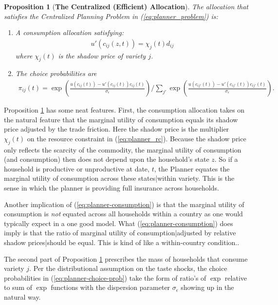 \documentclass[12pt,pdftex]{article}
\newtheorem{prp}{Proposition}
\begin{document}
\begin{onehalfspacing}
\begin{prp}[\textbf{The Centralized (Efficient) Allocation}]\label{prp:efficient-allocation} The allocation that satisfies the Centralized Planning Problem in (\ref{eq:planner_problem}) is:
\begin{enumerate}
\item A consumption allocation satisfying:
\begin{align}
u'(c_{ij}(z,t) ) = \chi_{j}(t) d_{ij}
\label{eq:planner-consumption}
\end{align}
where $\chi_{j}(t)$ is the shadow price of variety $j$.
\item The choice probabilities are
\begin{align}
\pi_{ij}(t) =\exp \left( \frac{u(c_{ij}(t)) - u'(c_{ij}(t))c_{ij}(t)}{\sigma_{\epsilon}}\right) \bigg / \sum_{j'}\exp \left( \frac{u(c_{ij'}(t)) - u'(c_{ij'}(t))c_{ij'}(t)}{\sigma_{\epsilon}} \right).
\label{eq:planner-choice-prob}
\end{align}
\end{enumerate}
\end{prp}
Proposition \ref{prp:efficient-allocation} has some neat features. First, the consumption allocation takes on the natural feature that the marginal utility of consumption equals its shadow price adjusted by the trade friction. Here the shadow price is the multiplier $\chi_{j}(t)$ on the resource constraint in (\ref{eq:planner_rc}). Because the shadow price only reflects the scarcity of the commodity, the marginal utility of consumption (and consumption) then does not depend upon the household's state $z$. So if a household is productive or unproductive at date, $t$, the Planner equates the marginal utility of consumption across these states|within variety. This is the sense in which the planner is providing full insurance across households.

Another implication of (\ref{eq:planner-consumption}) is that the marginal utility of consumption is \textit{not} equated across all households within a country as one would typically expect in a one good model. What (\ref{eq:planner-consumption}) does imply is that the ratio of marginal utility of consumption|adjusted by relative shadow prices|should be equal. This is kind of like a within-country \citet{backus1993} condition..

The second part of Proposition \ref{prp:efficient-allocation} prescribes the mass of households that consume variety $j$. Per the distributional assumption on the taste shocks, the choice probabilities in (\ref{eq:planner-choice-prob}) take the form of ratio's of $\exp$ relative to sum of $\exp$ functions with the dispersion parameter $\sigma_{\epsilon}$ showing up in the natural way.


\end{onehalfspacing}
\end{document}
